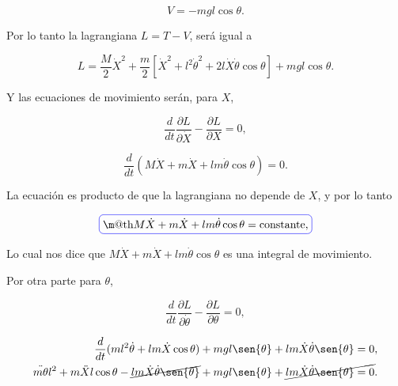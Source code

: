 \documentclass[a4paper,10pt]{article}
\makeatletter
\numberwithin{equation}{section}
\newcommand*{\boxcolor}{blue}
\renewcommand{\boxed}[1]{\textcolor{\boxcolor}{%
\tikz[baseline={([yshift=-1ex]current bounding box.center)}] \node [rectangle, minimum width=1ex,rounded corners,draw] {\normalcolor\m@th$\displaystyle#1$};}}
\makeatother
\begin{document}
\begin{equation}
 V = -mgl \cos{\theta}.
\end{equation}

Por lo tanto la lagrangiana $L = T - V$, será igual a 

\begin{equation}
 L = \frac{M}{2}\dot{X}^2 + \frac{m}{2}[\dot{X}^2 + l^2 \dot{\theta}^2 + 
    2l\dot{X}\dot{\theta}\cos{\theta}] + mgl \cos{\theta}.
\end{equation}

Y las ecuaciones de movimiento serán, para $X$,

\begin{equation}
 \frac{d}{dt}\frac{\partial L}{\partial \dot{X}} - \frac{\partial L}{\partial X} = 0,
\end{equation}

\begin{equation}
 \frac{d}{dt} (M \dot{X} + m \dot{X} + lm\dot{\theta}\cos{\theta}) = 0.
 \label{eq:pendu7}
\end{equation}

La ecuación  es producto de que la lagrangiana no depende de $X$, y por 
lo tanto

\begin{equation}
 \boxed{M \dot{X} + m \dot{X} + lm\dot{\theta}\cos{\theta} = \text{constante},}
\end{equation}

Lo cual nos dice que $M \dot{X} + m \dot{X} + lm\dot{\theta}\cos{\theta}$ es una integral 
de movimiento.

\vspace{.3cm}

Por otra parte para $\theta$,

\begin{equation}
  \frac{d}{dt}\frac{\partial L}{\partial \dot{\theta}} - \frac{\partial L}{\partial \theta} = 0,
\end{equation}

\begin{align}
\begin{split}
 \frac{d}{dt}(ml^2 \dot{\theta} + lm \dot{X} \cos{\theta}) + mgl\sen{\theta} +
 lm \dot{X} \dot{\theta} \sen{\theta} = 0, \\
 \ddot{m\theta}l^2  + m\ddot{X}l\cos{\theta} - \cancel{lm\dot{X}\dot{\theta}\sen{\theta}} + mgl\sen{\theta} +
 \cancel{lm \dot{X} \dot{\theta} \sen{\theta} = 0}. \\
 \end{split}
\end{align}
\end{document}
